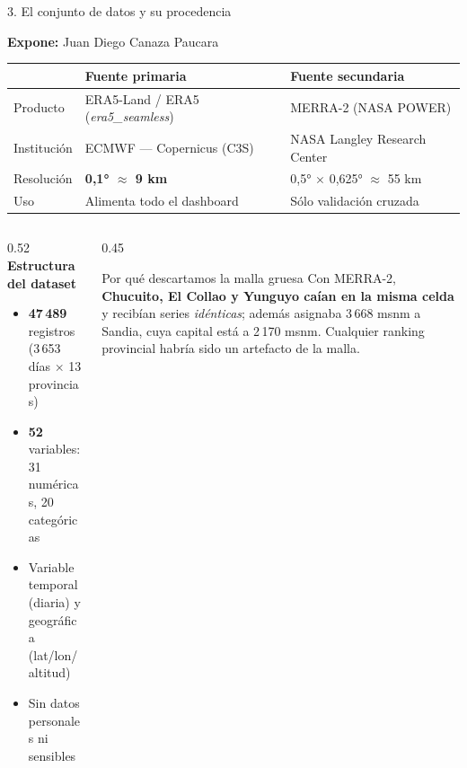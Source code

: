 \documentclass[aspectratio=169,11pt]{beamer}
\newcommand{\ponente}[1]{%
  \begin{flushright}\tiny\textcolor{pnBrandDark}{\textbf{Expone:} #1}\end{flushright}%
  \vspace{-0.9em}%
}
\begin{document}
\begin{frame}{3. El conjunto de datos y su procedencia}
  \ponente{Juan Diego Canaza Paucara}
  \scriptsize
  \begin{tabular}{@{}p{2.2cm}p{5.1cm}p{5.1cm}@{}}
    \toprule
     & \textbf{Fuente primaria} & \textbf{Fuente secundaria} \\
    \midrule
    Producto      & ERA5-Land / ERA5 (\emph{era5\_seamless}) & MERRA-2 (NASA POWER) \\
    Institución   & ECMWF — Copernicus (C3S) & NASA Langley Research Center \\
    Resolución    & \textbf{0,1° $\approx$ 9 km} & 0,5° $\times$ 0,625° $\approx$ 55 km \\
    Uso           & Alimenta todo el dashboard & Sólo validación cruzada \\
    \bottomrule
  \end{tabular}

  \vspace{0.8em}
  \small
  \begin{columns}[T]
    \begin{column}{0.52\textwidth}
      \textbf{Estructura del dataset}
      \begin{itemize}\itemsep0.2em
        \item \textbf{47\,489} registros (3\,653 días $\times$ 13 provincias)
        \item \textbf{52} variables: 31 numéricas, 20 categóricas
        \item Variable temporal (diaria) y geográfica (lat/lon/altitud)
        \item Sin datos personales ni sensibles
      \end{itemize}
    \end{column}
    \begin{column}{0.45\textwidth}
      \begin{block}{Por qué descartamos la malla gruesa}
        \scriptsize Con MERRA-2, \textbf{Chucuito, El Collao y Yunguyo caían en la misma celda} y
        recibían series \emph{idénticas}; además asignaba 3\,668 msnm a Sandia, cuya capital está a
        2\,170 msnm. Cualquier ranking provincial habría sido un artefacto de la malla.
      \end{block}
    \end{column}
  \end{columns}
\end{frame}
\end{document}
